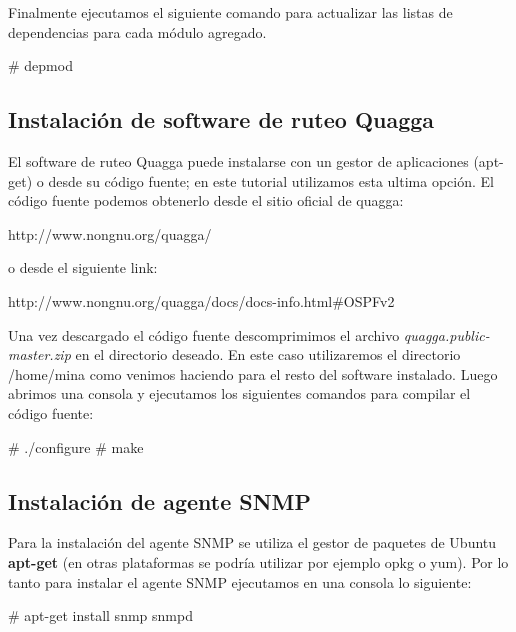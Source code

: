 Finalmente ejecutamos el siguiente comando para actualizar las listas de dependencias para cada módulo agregado.

\begin{bash}
# depmod
\end{bash}

\subsection{Instalación de software de ruteo Quagga}
El software de ruteo Quagga puede instalarse con un gestor de aplicaciones (apt-get) o desde su código fuente; en este tutorial utilizamos esta ultima opción. El código fuente podemos obtenerlo desde el sitio oficial de quagga:

\begin{center}
http://www.nongnu.org/quagga/
\end{center}
 
o desde el siguiente link:

\begin{center}
http://www.nongnu.org/quagga/docs/docs-info.html\#OSPFv2
\end{center}

Una vez descargado el código fuente descomprimimos el archivo \textit{quagga.public-master.zip} en el directorio deseado. En este caso utilizaremos el directorio /home/mina como venimos haciendo para el resto del software instalado. Luego abrimos una consola y ejecutamos los siguientes comandos para compilar el código fuente:

\begin{bash}
# ./configure
# make 
\end{bash}

\subsection{Instalaci\'on de agente SNMP}
Para la instalaci\'on del agente SNMP se utiliza el gestor de paquetes de Ubuntu \textbf{apt-get} (en otras plataformas se podr\'ia utilizar por ejemplo opkg o yum). Por lo tanto para instalar el agente SNMP ejecutamos en una consola lo siguiente:

\begin{bash}
# apt-get install snmp snmpd
\end{bash}


